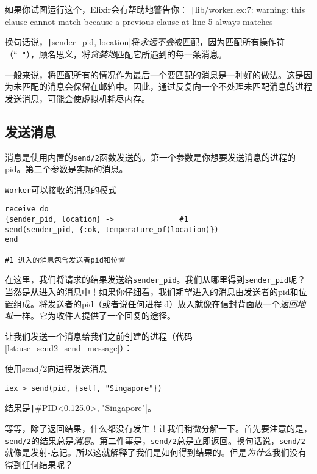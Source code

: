 如果你试图运行这个，Elixir会有帮助地警告你：
\texttt|{lib/worker.ex:7: warning: this clause cannot match because a previous clause at line 5 always matches}|

换句话说，\texttt|{sender_pid, location}|将\emph{永远不会}被匹配，因为匹配所有操作符（``\texttt{\_"}），顾名思义，将\emph{贪婪地}匹配它所遇到的每一条消息。

一般来说，将匹配所有的情况作为最后一个要匹配的消息是一种好的做法。这是因为未匹配的消息会保留在邮箱中。因此，通过反复向一个不处理未匹配消息的进程发送消息，可能会使虚拟机耗尽内存。

 \subsection{ 发送消息}

消息是使用内置的\texttt{send/2}函数发送的。第一个参数是你想要发送消息的进程的pid。第二个参数是实际的消息。

\begin{code}{\texttt{Worker}可以接收的消息的模式}
\begin{verbatim}
receive do
{sender_pid, location} ->               #1
send(sender_pid, {:ok, temperature_of(location)})
end

#1 进入的消息包含发送者pid和位置
\end{verbatim}
\label{lst:worker_receive_message_pattern}
\end{code}

在这里，我们将请求的结果发送给\texttt{sender\_pid}。我们从哪里得到\texttt{sender\_pid}呢？当然是从进入的消息中！如果你仔细看，我们期望进入的消息由发送者的pid和位置组成。将发送者的pid（或者说任何进程id）放入就像在信封背面放一个\emph{返回地址}一样。它为收件人提供了一个回复的途径。

让我们发送一个消息给我们之前创建的进程（代码\ref{lst:use_send2_send_message}）：

\begin{code}{使用send/2向进程发送消息}
\begin{verbatim}
iex > send(pid, {self, "Singapore"})
\end{verbatim}
\label{lst:use_send2_send_message}
\end{code}

结果是\texttt|{#PID<0.125.0>, "Singapore"}|。

等等，除了返回结果，什么都没有发生！让我们稍微分解一下。首先要注意的是，\texttt{send/2}的结果总是\emph{消息}。第二件事是，\texttt{send/2}总是立即返回。换句话说，\texttt{send/2}就像是发射-忘记。所以这就解释了我们是如何得到结果的。但是\emph{为什么}我们没有得到任何结果呢？

